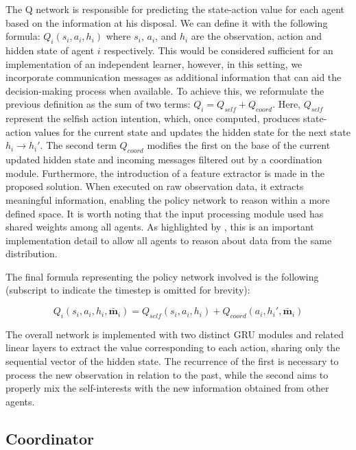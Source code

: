 \documentclass[a4paper,singleside,12pt]{report} %
\begin{document}
The Q network is responsible for predicting the state-action value for each agent based on the information at his disposal. We can define it with the following formula: $Q_i(s_i,a_i,h_i)$ where $s_i$, $a_i$, and $h_i$ are the observation, action and hidden state of agent $i$ respectively. This would be considered sufficient for an implementation of an independent learner, however, in this setting, we incorporate communication messages as additional information that can aid the decision-making process when available. To achieve this, we reformulate the previous definition as the sum of two terms: $Q_i = Q_{self} + Q_{coord}$. Here, $Q_{self}$ represent the selfish action intention, which, once computed, produces state-action values for the current state and updates the hidden state for the next state $h_i \rightarrow h_i'$. The second term $Q_{coord}$ modifies the first on the base of the current updated hidden state and incoming messages filtered out by a coordination module. Furthermore, the introduction of a feature extractor is made in the proposed solution. When executed on raw observation data, it extracts meaningful information, enabling the policy network to reason within a more defined space. It is worth noting that the input processing module used has shared weights among all agents. As highlighted by \cite{Lin2021LearningTG}, this is an important implementation detail to allow all agents to reason about data from the same distribution.

The final formula representing the policy network involved is the following (subscript to indicate the timestep is omitted for brevity):

  \begin{equation}
    Q_i(s_i,a_i,h_i,\bar{\textbf{m}}_i) = Q_{self}(s_i,a_i,h_i) + Q_{coord}(a_i,h_i',\bar{\textbf{m}}_i)
  \end{equation}
  
  The overall network is implemented with two distinct GRU modules and related linear layers to extract the value corresponding to each action, sharing only the sequential vector of the hidden state. The recurrence of the first is necessary to process the new observation in relation to the past, while the second aims to properly mix the self-interests with the new information obtained from other agents.


\subsection{Coordinator}\label{coordinator}
\end{document}
